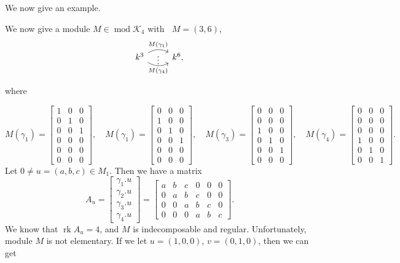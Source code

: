 \documentclass[a4paper,12pt]{amsart}
\newcommand{\cK}{\mathcal{K}}
\DeclareMathOperator{\rk}{rk}
\DeclareMathOperator{\modd}{mod}
\DeclareMathOperator{\dimu}{\underline{dim}}
\newenvironment{example}[1][Example.]{\begin{trivlist}
\item[\hskip \labelsep {\bfseries #1}]}{\end{trivlist}}
\begin{document}
We now give an example. 

\begin{example}
We now give a module $M\in \modd\cK_4$ with $\dimu M=(3,6)$, 
 \[
\begin{tikzcd}
   k^3
    \arrow[r, draw=none, "{\vdots}" description]
    \arrow[r, bend left,        "M(\gamma_1)"]
    \arrow[r, bend right, swap, "M(\gamma_4)"]
    &
    k^6,
\end{tikzcd}
\]

\end{example}
where 

\[ M(\gamma_1)=\begin{bmatrix}
1 & 0 & 0 \\
0 & 1 & 0\\
0 & 0 & 1\\
0 & 0 & 0\\
0 & 0&0\\
0 & 0&0
\end{bmatrix}, \quad M(\gamma_1)=\begin{bmatrix}
0 & 0 & 0 \\
1 & 0 & 0\\
0 & 1 & 0\\
0 & 0 & 1\\
0 & 0&0\\
0 & 0&0
\end{bmatrix}, \quad M(\gamma_3)=\begin{bmatrix}
0 & 0 & 0 \\
0 & 0 & 0\\
1 & 0 & 0\\
0 & 1 & 0\\
0 & 0&1\\
0 & 0&0
\end{bmatrix}, \quad M(\gamma_4)=\begin{bmatrix}
0 & 0 & 0 \\
0 & 0 & 0\\
0 & 0 & 0\\
1 & 0 & 0\\
0 & 1&0\\
0 & 0&1
\end{bmatrix}. \]
Let  $0\neq u=(a,b,c)\in M_1$. Then we have a matrix
\[A_u=\begin{bmatrix}
\gamma_1.u\\
\gamma_2.u\\
\gamma_3.u\\
\gamma_4.u
\end{bmatrix} =  \begin{bmatrix}
a & b & c & 0 & 0 & 0\\
0 &  a& b & c & 0 & 0 \\
0 & 0 & a & b & c & 0\\
 0 & 0 &0 &a & b & c
\end{bmatrix}. \]
We know that $\rk A_u=4$, and $M$ is indecomposable and regular. Unfortunately, module $M$ is not elementary. If we let $u=(1,0,0)$, $v=(0,1,0)$, then we can get 
\end{document}
